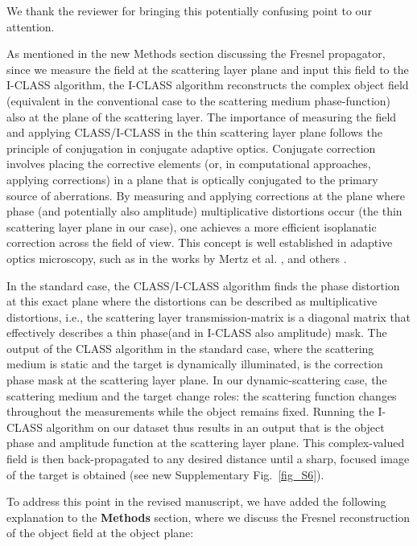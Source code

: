 \documentclass[12pt]{article}
\newenvironment{finished_ourresponse}
    {\begin{tcolorbox}[width=\linewidth,breakable,enhanced,colback=gray!5,colframe=finished_responsecolor!50,title=Response,left=5pt,right=5pt]}
    {\end{tcolorbox}}
\begin{document}
\begin{finished_ourresponse}
    We thank the reviewer for bringing this potentially confusing point to our attention. 
    
    As mentioned in the new Methods section discussing the Fresnel propagator, since we measure the field at the scattering layer plane and input this field to the I-CLASS algorithm, the I-CLASS algorithm reconstructs the complex object field (equivalent in the conventional case to the scattering medium phase-function) also at the plane of the scattering layer. 
    The importance of measuring the field and applying CLASS/I-CLASS in the thin scattering layer plane follows the principle of conjugation in conjugate adaptive optics. Conjugate correction involves placing the corrective elements (or, in computational approaches, applying corrections) in a plane that is optically conjugated to the primary source of aberrations. By measuring and applying corrections at the plane where phase (and potentially also amplitude) multiplicative distortions occur (the thin scattering layer plane in our case), one achieves a more efficient isoplanatic correction across the field of view. This concept is well established in adaptive optics microscopy, such as in the works by Mertz et al. \cite{mertz2015field}, and others  \cite{kwon2023computational, sunray2024beyond}.
    
    In the standard case, the CLASS/I-CLASS algorithm finds the phase distortion at this exact plane where the distortions can be described as multiplicative distortions, i.e., the scattering layer transmission-matrix is a diagonal matrix that effectively describes a thin phase(and in I-CLASS also amplitude) mask.
    The output of the CLASS algorithm in the standard case, where the scattering medium is static and the target is dynamically illuminated, is the correction phase mask at the scattering layer plane. In our dynamic-scattering case, the scattering medium and the target change roles: the scattering function changes throughout the measurements while the object remains fixed. Running the I-CLASS algorithm on our dataset thus results in an output that is the object phase and amplitude function at the scattering layer plane. This complex-valued field is then back-propagated to any desired distance until a sharp, focused image of the target is obtained (see new Supplementary Fig.~\ref{fig_S6}).

    To address this point in the revised manuscript, we have added the following explanation to the \textbf{ Methods} section, where we discuss the Fresnel reconstruction of the object field at the object plane:


\end{finished_ourresponse}
\end{document}
